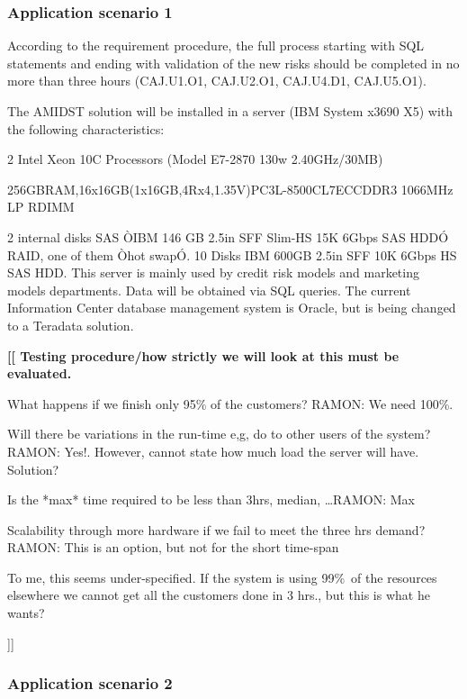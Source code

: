 \documentclass{article}
\theoremstyle{theorem}
\theoremstyle{definition}
\newcommand{\comment}[1]{ \begin{center}{\bf [[ #1 ]]}\end{center}}
\begin{document}
\subsubsection{Application scenario 1}

According to the requirement procedure, the full process starting with SQL statements and ending with validation of the new risks should be completed in no more than three hours (CAJ.U1.O1, CAJ.U2.O1, CAJ.U4.D1, CAJ.U5.O1).

The AMIDST solution will be installed in a server (IBM System x3690 X5) with the following characteristics:
\bit
\item 2 Intel Xeon 10C Processors (Model E7-2870 130w 2.40GHz/30MB)
\item 256GBRAM,16x16GB(1x16GB,4Rx4,1.35V)PC3L-8500CL7ECCDDR3
1066MHz LP RDIMM
\item 2 internal disks SAS ÒIBM 146 GB 2.5in SFF Slim-HS 15K 6Gbps SAS HDDÓ RAID, one of them Òhot swapÓ. 10 Disks IBM 600GB 2.5in SFF 10K 6Gbps HS SAS HDD.
\eit
This server is mainly used by credit risk models and marketing models departments. Data will be obtained via SQL queries. The current Information Center database management system is Oracle, but is being changed to a Teradata solution.



\comment{Testing procedure/how strictly we will look at this must be evaluated.
\bit 
\item What happens if we finish only 95\% of the customers? RAMON: We need 100\%. 
\item Will there be variations in the run-time e,g, do to other users of the system? RAMON: Yes!. However, cannot state how much load the server will have. Solution?
\item Is the *max* time required to be less than 3hrs, median, \ldots RAMON: Max
\item Scalability through more hardware if we fail to meet the three hrs demand? RAMON: This is an option, but not for the short time-span
\eit

To me, this seems under-specified. If the system is using 99\%\ of the resources elsewhere we cannot get all the customers done in 3 hrs., but this is what he wants?

}



\subsubsection{Application scenario 2}
\end{document}
